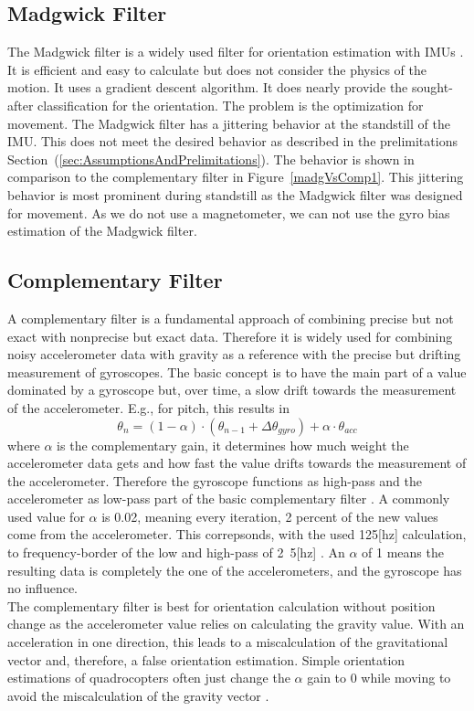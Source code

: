 \documentclass[letterpaper, 10 pt, conference]{ieeeconf}  %
\begin{document}
\subsection{Madgwick Filter}
The Madgwick filter is a widely used filter for orientation estimation with IMUs \cite{madgwick2010}.
It is efficient and easy to calculate but does not consider the physics of the motion.
It uses a gradient descent algorithm.
It does nearly provide the sought-after classification for the orientation.
The problem is the optimization for movement. The Madgwick filter has a jittering behavior at the standstill of the IMU.
This does not meet the desired behavior as described in the prelimitations Section~(\ref{sec:AssumptionsAndPrelimitations}).
The behavior is shown in comparison to the complementary filter in Figure~\ref{madgVsComp1}.
This jittering behavior is most prominent during standstill as the Madgwick filter was designed for movement.
As we do not use a magnetometer, we can not use the gyro bias estimation of the Madgwick filter.
\subsection{Complementary Filter}
A complementary filter is a fundamental approach of combining precise but not exact with nonprecise but exact data.
Therefore it is widely used for combining noisy accelerometer data with gravity as a reference with the precise but drifting measurement of gyroscopes.
The basic concept is to have the main part of a value dominated by a gyroscope but, over time, a slow drift towards the measurement of the accelerometer.
E.g., for pitch, this results in 
\begin{equation}
\theta_n = (1-\alpha) \cdot (\theta_{n-1}+ \Delta\theta_{gyro})+ \alpha \cdot \theta_{acc}
\end{equation}
where $\alpha$ is the complementary gain, it determines how much weight the accelerometer data gets and how fast the value drifts towards the measurement of the accelerometer.
Therefore the gyroscope functions as high-pass and the accelerometer as low-pass part of the basic complementary filter \cite{min2015complementary}.
A commonly used value for $\alpha$ is 0.02, meaning every iteration, 2 percent of the new values come from the accelerometer.
This correpsonds, with the used \unit{125}[hz] calculation, to frequency-border of the low and high-pass  of \unit{2.5}[hz] \cite{hajdu2017complementary}.
An $\alpha$ of 1 means the resulting data is completely the one of the accelerometers, and the gyroscope has no influence. \\
The complementary filter is best for orientation calculation without position change as the accelerometer value relies on calculating the gravity value.
With an acceleration in one direction, this leads to a miscalculation of the gravitational vector and, therefore, a false orientation estimation.
Simple orientation estimations of quadrocopters often just change the $\alpha$ gain to 0 while moving to avoid the miscalculation of the gravity vector \cite{mahony2005complementary}.
\end{document}
